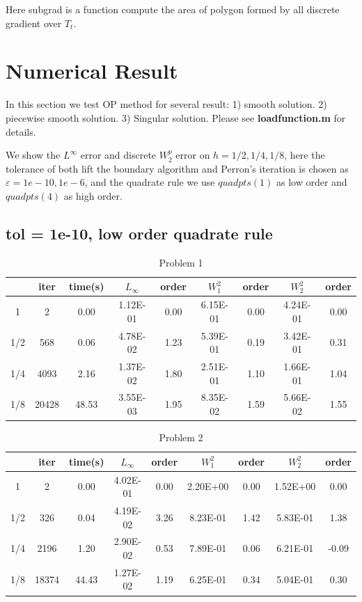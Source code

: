 \documentclass{article}
\begin{document}
Here subgrad is a function compute the area of polygon formed by all discrete gradient over $T_t$.

\section{Numerical Result}
In this section we test OP method for several result: 1)  smooth solution. 2) piecewise smooth solution. 3) Singular solution. Please see \textbf{loadfunction.m} for details.

We show the $L^\infty$ error and discrete $W_2^p$ error on $h = 1/2, 1/4, 1/8$, here the tolerance of both lift the boundary algorithm and Perron's iteration is chosen as $\varepsilon = 1e-10, 1e-6$, and the quadrate rule we use $quadpts(1)$ as low order and $quadpts(4)$ as high order. 
\subsection{tol = 1e-10, low order quadrate rule}
\begin{table}[H]
	\centering
	\caption{Problem 1}
	\begin{tabular}{|c|c|c|c|c|c|c|c|c|}
		\hline
		& iter  & time(s) & $L_{\infty}$ & order & $W_1^2$  & order & $W_2^2$  & order \\ \hline
		1   & 2     & 0.00    & 1.12E-01     & 0.00  & 6.15E-01 & 0.00  & 4.24E-01 & 0.00  \\ \hline
		1/2 & 568   & 0.06    & 4.78E-02     & 1.23  & 5.39E-01 & 0.19  & 3.42E-01 & 0.31  \\ \hline
		1/4 & 4093  & 2.16    & 1.37E-02     & 1.80  & 2.51E-01 & 1.10  & 1.66E-01 & 1.04  \\ \hline
		1/8 & 20428 & 48.53   & 3.55E-03     & 1.95  & 8.35E-02 & 1.59  & 5.66E-02 & 1.55  \\ \hline
	\end{tabular}
\end{table}
\begin{table}[H]
	\centering
	\caption{Problem 2}
	\begin{tabular}{|c|c|c|c|c|c|c|c|c|}
		\hline
		& iter  & time(s) & $L_{\infty}$ & order & $W_1^2$  & order & $W_2^2$  & order \\ \hline
		1   & 2     & 0.00    & 4.02E-01     & 0.00  & 2.20E+00 & 0.00  & 1.52E+00 & 0.00  \\ \hline
		1/2 & 326   & 0.04    & 4.19E-02     & 3.26  & 8.23E-01 & 1.42  & 5.83E-01 & 1.38  \\ \hline
		1/4 & 2196  & 1.20    & 2.90E-02     & 0.53  & 7.89E-01 & 0.06  & 6.21E-01 & -0.09 \\ \hline
		1/8 & 18374 & 44.43   & 1.27E-02     & 1.19  & 6.25E-01 & 0.34  & 5.04E-01 & 0.30  \\ \hline
	\end{tabular}
\end{table}
\end{document}
